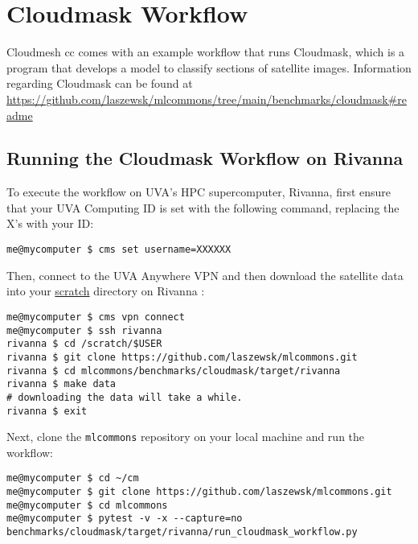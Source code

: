 
\section{Cloudmask Workflow}\label{cloudmask-workflow}

Cloudmesh cc comes with an example workflow that runs Cloudmask, which
is a program that develops a model to classify sections of satellite
images. Information regarding Cloudmask can be found at
\url{https://github.com/laszewsk/mlcommons/tree/main/benchmarks/cloudmask\#readme}

\subsection{Running the Cloudmask Workflow on
Rivanna}\label{running-the-cloudmask-workflow-on-rivanna}

To execute the workflow on UVA's HPC supercomputer, Rivanna, first
ensure that your UVA Computing ID is set with the following command,
replacing the X's with your ID:

\begin{verbatim}
me@mycomputer $ cms set username=XXXXXX
\end{verbatim}

Then, connect to the UVA Anywhere VPN and then download the satellite
data into your
\href{https://www.rc.virginia.edu/userinfo/storage/non-sensitive-data/\#scratch}{scratch}
directory on Rivanna \cite{www-rivanna}:

\smallskip
\begin{verbatim}
me@mycomputer $ cms vpn connect
me@mycomputer $ ssh rivanna
rivanna $ cd /scratch/$USER
rivanna $ git clone https://github.com/laszewsk/mlcommons.git
rivanna $ cd mlcommons/benchmarks/cloudmask/target/rivanna
rivanna $ make data
# downloading the data will take a while.
rivanna $ exit
\end{verbatim}
\smallskip

Next, clone the \texttt{mlcommons} repository on your local machine and
run the workflow:

\smallskip
\begin{verbatim}
me@mycomputer $ cd ~/cm
me@mycomputer $ git clone https://github.com/laszewsk/mlcommons.git
me@mycomputer $ cd mlcommons
me@mycomputer $ pytest -v -x --capture=no benchmarks/cloudmask/target/rivanna/run_cloudmask_workflow.py
\end{verbatim}
\smallskip

